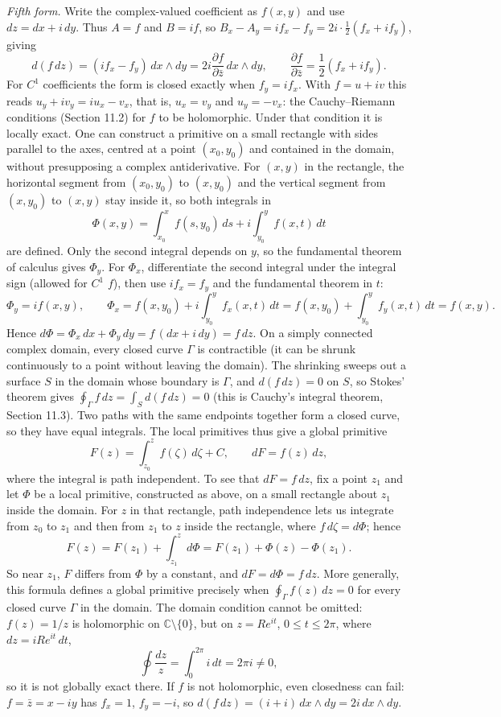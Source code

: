\emph{Fifth form.} Write the complex-valued coefficient as $f(x,y)$
and use $dz=dx+i\,dy$. Thus $A=f$ and $B=if$, so
$B_x-A_y=if_x-f_y=2i\cdot\frac12(f_x+if_y)$, giving
\[
d(f\,dz)=(if_x-f_y)\,dx\wedge dy
=2i\frac{\partial f}{\partial\bar z}\,dx\wedge dy,
\qquad
\frac{\partial f}{\partial\bar z}=\frac12(f_x+if_y).
\]
For $C^1$ coefficients the form is closed exactly when
$f_y=if_x$. With $f=u+iv$ this reads $u_y+iv_y=iu_x-v_x$, that is,
$u_x=v_y$ and $u_y=-v_x$: the Cauchy--Riemann conditions
(Section 11.2) for $f$ to be holomorphic.
Under that condition it is locally exact. One can construct a primitive
on a small rectangle with sides parallel to the axes, centred at a point
$(x_0,y_0)$ and contained in the domain, without presupposing a complex
antiderivative. For $(x,y)$ in the rectangle, the horizontal segment
from $(x_0,y_0)$ to $(x,y_0)$ and the vertical segment from $(x,y_0)$
to $(x,y)$ stay inside it, so both integrals in
\[
\Phi(x,y)=\int_{x_0}^{x}f(s,y_0)\,ds
          +i\int_{y_0}^{y}f(x,t)\,dt
\]
are defined. Only the second integral depends on $y$, so the
fundamental theorem of calculus gives $\Phi_y$. For $\Phi_x$, differentiate the second
integral under the integral sign (allowed for $C^1$ $f$), then use
$if_x=f_y$ and the fundamental theorem in $t$:
\[
\Phi_y=if(x,y),\qquad
\Phi_x=f(x,y_0)+i\int_{y_0}^{y}f_x(x,t)\,dt
=f(x,y_0)+\int_{y_0}^{y}f_y(x,t)\,dt=f(x,y).
\]
Hence $d\Phi=\Phi_x\,dx+\Phi_y\,dy=f\,(dx+i\,dy)=f\,dz$. On a simply
connected complex domain, every closed curve $\Gamma$ is contractible
(it can be shrunk continuously to a point without leaving the domain).
The shrinking sweeps out a surface $S$ in the domain whose boundary is
$\Gamma$, and $d(f\,dz)=0$ on $S$, so Stokes' theorem gives
$\oint_\Gamma f\,dz=\int_Sd(f\,dz)=0$ (this is Cauchy's integral
theorem, Section 11.3). Two paths with the same endpoints together
form a closed curve, so they have equal integrals.
The local primitives thus give a global primitive
\[
\boxed{F(z)=\int_{z_0}^{z}f(\zeta)\,d\zeta+C,\qquad dF=f(z)\,dz},
\]
where the integral is path independent. To see that $dF=f\,dz$, fix a
point $z_1$ and let $\Phi$ be a local primitive, constructed as above,
on a small rectangle about $z_1$ inside the domain. For $z$ in that
rectangle, path independence lets us integrate from $z_0$ to $z_1$ and
then from $z_1$ to $z$ inside the rectangle, where $f\,d\zeta=d\Phi$;
hence
\[
F(z)=F(z_1)+\int_{z_1}^{z}d\Phi=F(z_1)+\Phi(z)-\Phi(z_1).
\]
So near $z_1$, $F$ differs from $\Phi$ by a constant, and
$dF=d\Phi=f\,dz$. More generally, this formula defines a global
primitive precisely when $\oint_\Gamma f(z)\,dz=0$ for every closed
curve $\Gamma$ in the domain. The domain condition cannot be omitted:
$f(z)=1/z$ is holomorphic on $\mathbb C\setminus\{0\}$, but on
$z=Re^{it}$, $0\le t\le2\pi$, where $dz=iRe^{it}\,dt$,
\[
\oint\frac{dz}{z}=\int_0^{2\pi}i\,dt=2\pi i\ne0,
\]
so it is not globally exact there. If $f$ is not holomorphic, even
closedness can fail: $f=\bar z=x-iy$ has $f_x=1$, $f_y=-i$, so
$d(f\,dz)=(i+i)\,dx\wedge dy=2i\,dx\wedge dy$.
